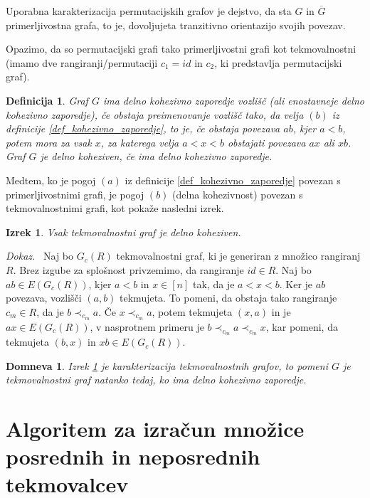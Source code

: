 \documentclass[a4paper, 12pt]{book}
\newtheorem{definicija}{Definicija}[chapter]
\newtheorem{izrek}{Izrek}[chapter]
\newtheorem{domneva}{Domneva}[chapter]
\newenvironment{dokaz}{\emph{Dokaz.}\ }{\hspace{\fill}{$\Box$}}
\begin{document}
Uporabna karakterizacija permutacijskih grafov je dejstvo, da sta $G$ in $\overline{G}$ primerljivostna grafa, to je, dovoljujeta tranzitivno orientazijo svojih povezav. 

Opazimo, da so permutacijski grafi tako primerljivostni grafi kot tekmovalnostni (imamo dve rangiranji/permutaciji $c_1 = id$ in $c_2$, ki predstavlja permutacijski graf).

\begin{definicija}
    Graf $G$ ima delno kohezivno zaporedje vozlišč (ali enostavneje delno kohezivno zaporedje), če obstaja preimenovanje vozlišč tako, da velja $(b)$ iz definicije \ref{def_kohezivno_zaporedje}, to je, če obstaja povezava $ab$, kjer $a < b$, potem mora za vsak $x$, za katerega velja $a < x < b$ obstajati povezava $ax$ ali $xb$. Graf $G$ je delno koheziven, če ima delno kohezivno zaporedje.
\end{definicija}

Medtem, ko je pogoj $(a)$ iz definicije \ref{def_kohezivno_zaporedje} povezan s primerljivostnimi grafi, je pogoj $(b)$ (delna kohezivnost) povezan s tekmovalnostnimi grafi, kot pokaže nasledni izrek.

\begin{izrek}
\label{tekmovalnosni_graf_delno_koheziven}
    Vsak tekmovalnostni graf je delno koheziven.
\end{izrek}
\begin{dokaz}
    Naj bo $G_c(R)$ tekmovalnostni graf, ki je generiran z množico rangiranj $R$. Brez izgube za splošnost privzemimo, da rangiranje $id \in R$. Naj bo $ab \in E(G_c(R))$, kjer $a < b$ in $x \in [n]$ tak, da je $a < x < b$. Ker je $ab$ povezava, vozlišči $(a, b)$ tekmujeta. To pomeni, da obstaja tako rangiranje $c_m \in R$, da je $b \prec_{c_m} a$. Če $x \prec_{c_m} a$, potem tekmujeta $(x, a)$ in je $ax \in E(G_c(R))$, v nasprotnem primeru je $b \prec_{c_m} a \prec_{c_m} x$, kar pomeni, da tekmujeta $(b, x)$ in $xb \in E(G_c(R))$.
\end{dokaz}

\begin{domneva}
    Izrek \ref{tekmovalnosni_graf_delno_koheziven} je karakterizacija tekmovalnostnih grafov, to pomeni $G$ je tekmovalnostni graf natanko tedaj, ko ima delno kohezivno zaporedje.
\end{domneva}

\chapter{ Algoritem za izračun množice posrednih in neposrednih tekmovalcev }
\end{document}
